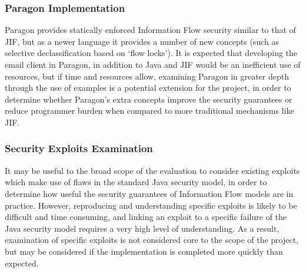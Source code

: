 	\subsubsection{Paragon Implementation}
	
	Paragon provides statically enforced Information Flow security similar to that of JIF, but as a newer language it provides a number of new concepts (such as selective declassification based on `flow locks'). It is expected that developing the email client in Paragon, in addition to Java and JIF would be an inefficient use of resources, but if time and resources allow, examining Paragon in greater depth through the use of examples is a potential extension for the project, in order to determine whether Paragon's extra concepts improve the security guarantees or reduce programmer burden when compared to more traditional mechanisms like JIF.
	
	\subsubsection{Security Exploits Examination}
	
	It may be useful to the broad scope of the evaluation to consider existing exploits which make use of flaws in the standard Java security model, in order to determine how useful the security guarantees of Information Flow models are in practice. However, reproducing and understanding specific exploits is likely to be difficult and time consuming, and linking an exploit to a specific failure of the Java security model requires a very high level of understanding. As a result, examination of specific exploits is not considered core to the scope of the project, but may be considered if the implementation is completed more quickly than expected.